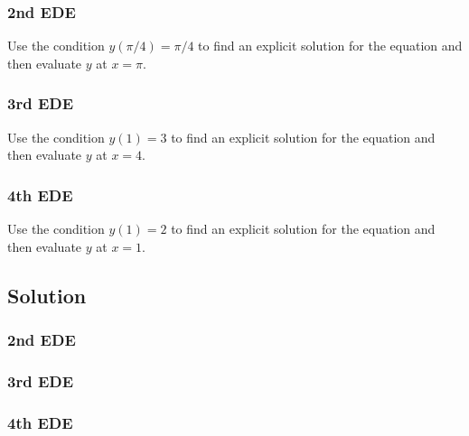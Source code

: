 \subsubsection{2nd EDE}
Use the condition $y(\pi/4)=\pi/4$ to find an explicit solution for the equation and then evaluate $y$ at $x=\pi$.

\subsubsection{3rd EDE}
Use the condition $y(1)=3$ to find an explicit solution for the equation and then evaluate $y$ at $x=4$.

\subsubsection{4th EDE}
Use the condition $y(1)=2$ to find an explicit solution for the equation and then evaluate $y$ at $x=1$.


\subsection*{Solution}

\subsubsection{2nd EDE}
\six{}


\subsubsection{3rd EDE}
\six{}


\subsubsection{4th EDE}
\six{}


\timebox






